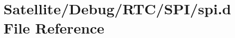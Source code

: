 \hypertarget{_debug_2_r_t_c_2_s_p_i_2spi_8d}{\section{Satellite/\-Debug/\-R\-T\-C/\-S\-P\-I/spi.d File Reference}
\label{_debug_2_r_t_c_2_s_p_i_2spi_8d}
}
